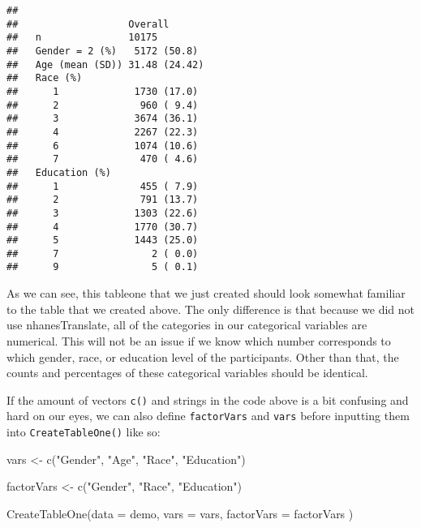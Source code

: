 \documentclass[
]{book}
\newenvironment{Shaded}{\begin{snugshade}}{\end{snugshade}}
\newcommand{\AttributeTok}[1]{\textcolor[rgb]{0.77,0.63,0.00}{#1}}
\newcommand{\FunctionTok}[1]{\textcolor[rgb]{0.00,0.00,0.00}{#1}}
\newcommand{\NormalTok}[1]{#1}
\newcommand{\OtherTok}[1]{\textcolor[rgb]{0.56,0.35,0.01}{#1}}
\newcommand{\StringTok}[1]{\textcolor[rgb]{0.31,0.60,0.02}{#1}}
\begin{document}
\begin{verbatim}
##
##                   Overall
##   n               10175
##   Gender = 2 (%)   5172 (50.8)
##   Age (mean (SD)) 31.48 (24.42)
##   Race (%)
##      1             1730 (17.0)
##      2              960 ( 9.4)
##      3             3674 (36.1)
##      4             2267 (22.3)
##      6             1074 (10.6)
##      7              470 ( 4.6)
##   Education (%)
##      1              455 ( 7.9)
##      2              791 (13.7)
##      3             1303 (22.6)
##      4             1770 (30.7)
##      5             1443 (25.0)
##      7                2 ( 0.0)
##      9                5 ( 0.1)
\end{verbatim}

As we can see, this tableone that we just created should look somewhat familiar to the table that we created above. The only difference is that because we did not use nhanesTranslate, all of the categories in our categorical variables are numerical. This will not be an issue if we know which number corresponds to which gender, race, or education level of the participants. Other than that, the counts and percentages of these categorical variables should be identical.

If the amount of vectors \texttt{c()} and strings in the code above is a bit confusing and hard on our eyes, we can also define \texttt{factorVars} and \texttt{vars} before inputting them into \texttt{CreateTableOne()} like so:

\begin{Shaded}
\begin{Highlighting}[]
\NormalTok{vars }\OtherTok{\textless{}{-}} \FunctionTok{c}\NormalTok{(}\StringTok{"Gender"}\NormalTok{, }\StringTok{"Age"}\NormalTok{, }\StringTok{"Race"}\NormalTok{, }\StringTok{"Education"}\NormalTok{)}
\end{Highlighting}
\end{Shaded}

\begin{Shaded}
\begin{Highlighting}[]
\NormalTok{factorVars }\OtherTok{\textless{}{-}} \FunctionTok{c}\NormalTok{(}\StringTok{"Gender"}\NormalTok{, }\StringTok{"Race"}\NormalTok{, }\StringTok{"Education"}\NormalTok{)}
\end{Highlighting}
\end{Shaded}

\begin{Shaded}
\begin{Highlighting}[]
\FunctionTok{CreateTableOne}\NormalTok{(}\AttributeTok{data =}\NormalTok{ demo,}
               \AttributeTok{vars =}\NormalTok{ vars,}
               \AttributeTok{factorVars =}\NormalTok{ factorVars}
\NormalTok{              )}
\end{Highlighting}
\end{Shaded}
\end{document}
